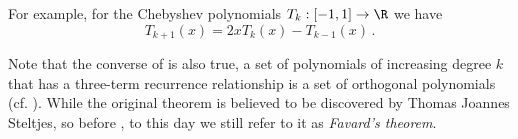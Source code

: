 For example, for the Chebyshev polynomials $T_k: [-1, 1] \to \R$ we have
$$T_{k+1}(x) = 2x T_k(x) - T_{k-1}(x) \,.$$

Note that the converse of  is also true, a set of polynomials of increasing degree $k$ that has a three-term recurrence relationship is a set of orthogonal polynomials (cf. ).
While the original theorem is believed to be discovered by Thomas Joannes Steltjes, so before \cite{1935-favard}, to this day we still refer to it as \textit{Favard's theorem}.

